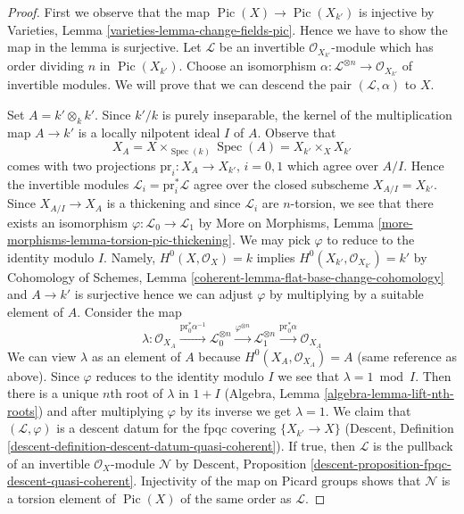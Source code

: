 \documentclass[10pt,a4paper]{amsart}
\theoremstyle{plain}
\theoremstyle{definition}
\theoremstyle{remark}
\numberwithin{equation}{subsection}
\def\Spec{\mathop{\mathrm{Spec}}}
\def\Pic{\mathop{\mathrm{Pic}}\nolimits}
\begin{document}
\begin{proof}
First we observe that the map $\Pic(X) \to \Pic(X_{k'})$
is injective by Varieties, Lemma \ref{varieties-lemma-change-fields-pic}.
Hence we have to show the map in the lemma is surjective.
Let $\mathcal{L}$ be an invertible $\mathcal{O}_{X_{k'}}$-module
which has order dividing $n$ in $\Pic(X_{k'})$.
Choose an isomorphism
$\alpha : \mathcal{L}^{\otimes n} \to \mathcal{O}_{X_{k'}}$
of invertible modules.
We will prove that we can descend the pair $(\mathcal{L}, \alpha)$
to $X$.

\medskip\noindent
Set $A = k' \otimes_k k'$. Since $k'/k$ is purely inseparable,
the kernel of the multiplication map $A \to k'$ is a
locally nilpotent ideal $I$ of $A$. Observe that
$$
X_A = X \times_{\Spec(k)} \Spec(A) = X_{k'} \times_X X_{k'}
$$
comes with two projections $\text{pr}_i : X_A \to X_{k'}$, $i = 0, 1$
which agree over $A/I$. Hence the invertible modules
$\mathcal{L}_i = \text{pr}_i^*\mathcal{L}$
agree over the closed subscheme $X_{A/I} = X_{k'}$.
Since $X_{A/I} \to X_A$ is a thickening and since
$\mathcal{L}_i$ are $n$-torsion, we see that there
exists an isomorphism $\varphi : \mathcal{L}_0 \to \mathcal{L}_1$ by
More on Morphisms, Lemma \ref{more-morphisms-lemma-torsion-pic-thickening}.
We may pick $\varphi$ to reduce to the identity modulo $I$. Namely,
$H^0(X, \mathcal{O}_X) = k$ implies
$H^0(X_{k'}, \mathcal{O}_{X_{k'}}) = k'$ by
Cohomology of Schemes, Lemma \ref{coherent-lemma-flat-base-change-cohomology}
and $A \to k'$ is surjective hence we can adjust $\varphi$ by multiplying by
a suitable element of $A$. Consider the map
$$
\lambda : \mathcal{O}_{X_A}
\xrightarrow{\text{pr}_0^*\alpha^{-1}}
\mathcal{L}_0^{\otimes n}
\xrightarrow{\varphi^{\otimes n}}
\mathcal{L}_1^{\otimes n}
\xrightarrow{\text{pr}_0^*\alpha}
\mathcal{O}_{X_A}
$$
We can view $\lambda$ as an element of $A$ because
$H^0(X_A, \mathcal{O}_{X_A}) = A$ (same reference as above).
Since $\varphi$ reduces to the identity modulo $I$ we
see that $\lambda = 1 \bmod I$. Then there is a unique
$n$th root of $\lambda$ in $1 + I$
(Algebra, Lemma \ref{algebra-lemma-lift-nth-roots})
and after multiplying $\varphi$ by its inverse we get $\lambda = 1$.
We claim that $(\mathcal{L}, \varphi)$ is a descent datum
for the fpqc covering $\{X_{k'} \to X\}$
(Descent, Definition \ref{descent-definition-descent-datum-quasi-coherent}).
If true, then $\mathcal{L}$ is the pullback of an invertible
$\mathcal{O}_X$-module $\mathcal{N}$ by
Descent, Proposition \ref{descent-proposition-fpqc-descent-quasi-coherent}.
Injectivity of the map on Picard groups shows that $\mathcal{N}$
is a torsion element of $\Pic(X)$ of the same order as $\mathcal{L}$.


\end{proof}
\end{document}
